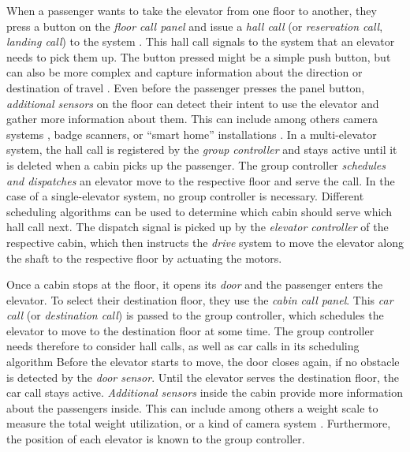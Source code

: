 When a passenger wants to take the elevator from one floor to another,
they press a button on the \emph{floor call panel} and issue a \emph{hall call} (or \emph{reservation call}, \emph{landing call}) to the system \autocite[][pp.~6--10]{siikonen1997models}.
This hall call signals to the system that an elevator needs to pick them up.
The button pressed might be a simple push button, but can also be more complex 
and capture information about the direction or destination of travel \autocite[][pp.~89--93]{unger2015aufzuege}.
Even before the passenger presses the panel button, \emph{additional sensors} 
on the floor can detect their intent to use the elevator and gather more information about them.
This can include among others camera systems \autocite[][]{lin2011control}, badge scanners, or \enquote{smart home} installations \autocite[][]{kwon2014sensor}.
In a multi-elevator system, the hall call is registered by the \emph{group controller} and stays active until it is deleted when a cabin picks up the passenger.
The group controller \emph{schedules and dispatches} an elevator move to the respective floor and serve the call.
In the case of a single-elevator system, no group controller is necessary.
Different scheduling algorithms can be used to determine which cabin should serve which hall call next.
The dispatch signal is picked up by the \emph{elevator controller} of the respective cabin, which then instructs the \emph{drive} system to move the elevator along the shaft to the respective floor by actuating the motors.

Once a cabin stops at the floor, it opens its \emph{door} and the passenger enters the elevator.
To select their destination floor, they use the \emph{cabin call panel}.
This \emph{car call} (or \emph{destination call}) \autocite[][pp.~6--10]{siikonen1997models} is passed to the group controller, 
which schedules the elevator to move to the destination floor at some time.
The group controller needs therefore to consider hall calls, as well as car calls in its scheduling algorithm
Before the elevator starts to move, the door closes again, if no obstacle is detected by the \emph{door sensor}.
Until the elevator serves the destination floor, the car call stays active.
\emph{Additional sensors} inside the cabin provide more information about the passengers inside.
This can include among others a weight scale to measure the total weight utilization, or a kind of camera system \autocite[][]{xang2016trafficlist}.
Furthermore, the position of each elevator is known to the group controller.

